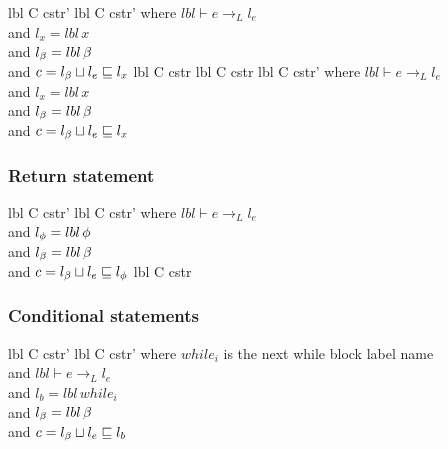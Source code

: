 \begin{trules}
        {lbl \vdash {} {C} {cstr'} }
        {lbl \vdash {} {C} {cstr'} }
        {where $lbl \vdash e \rightarrow_L l_e$\\
          and $l_x = lbl \, x$\\
          and $l_\beta = lbl \, \beta$\\
          and $c = l_\beta \sqcup l_e \sqsubseteq l_x$}
        {lbl \vdash {} {C} {cstr}}
        {}
        {}
        {lbl \vdash {} {C} {cstr}}
        {lbl \vdash {} {C} {cstr'}}
        {where $lbl \vdash e \rightarrow_L l_e$\\
          and $l_x = lbl \, x$\\
          and $l_\beta = lbl \, \beta$\\
          and $c = l_\beta \sqcup l_e \sqsubseteq l_x$}
\end{trules}

\subsubsection{Return statement}

\begin{trules}
        {lbl \vdash {} {C} {cstr'} }
        {lbl \vdash {} {C} {cstr'} }
        {where $lbl \vdash e \rightarrow_L l_e$\\
          and $l_\phi = lbl \, \phi$\\
          and $l_\beta = lbl \, \beta$\\
          and $c = l_\beta \sqcup l_e \sqsubseteq l_\phi$}
        {lbl \vdash {} {C} {cstr} }
        {}
        {}
        {}
\end{trules}

\subsubsection{Conditional statements}

\begin{trules}
        {lbl \vdash {} {C} {cstr'} }
        {lbl \vdash {} {C} {cstr'} }
        {where $while_i$ is the next while block label name\\
          and $lbl \vdash e \rightarrow_L l_e$\\
          and $l_b = lbl \, while_i$\\
          and $l_\beta = lbl \, \beta$\\
          and $c = l_\beta \sqcup l_e \sqsubseteq l_b$}
\end{trules}


